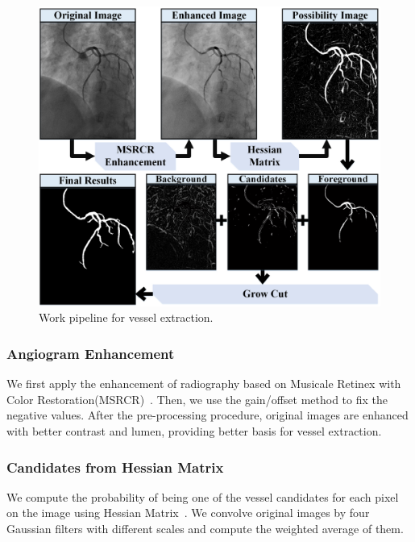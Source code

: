 \documentclass[journal]{IEEEtran}
\begin{document}
\begin{figure}[!t]
\centering
\includegraphics[width=1.0\linewidth]{./images/basis-pipeline.png}
\caption{Work pipeline for vessel extraction.}
\label{fig:pip_extraction}
\end{figure}

\subsubsection{\textbf{Angiogram Enhancement}}
We first apply the enhancement of radiography based on Musicale Retinex with Color Restoration(MSRCR)~\cite{rahman1996multi}. Then, we use the gain/offset method to fix the negative values. After the pre-processing procedure, original images are enhanced with better contrast and lumen, providing better basis for vessel extraction.

\subsubsection{\textbf{Candidates from Hessian Matrix}}
\label{subsubsec:hessian}
We compute the probability of being one of the vessel candidates for each pixel on the image using Hessian Matrix~\cite{Frangi}. We convolve original images by four Gaussian filters with different scales and compute the weighted average of them.
\end{document}
